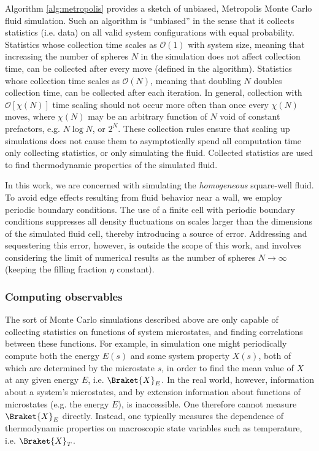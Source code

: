 \documentclass[11pt]{article}
\newcommand{\bk}{\Braket} %
\newcommand{\p}[1]{\left(#1\right)} %
\renewcommand{\sp}[1]{\left[#1\right]} %
\begin{document}
Algorithm \ref{alg:metropolis} provides a sketch of unbiased,
Metropolis Monte Carlo fluid simulation. Such an algorithm is
``unbiased'' in the sense that it collects statistics (i.e. data) on
all valid system configurations with equal probability. Statistics
whose collection time scales as $\mathcal O\p{1}$ with system size,
meaning that increasing the number of spheres $N$ in the simulation
does not affect collection time, can be collected after every move
(defined in the algorithm). Statistics whose collection time scales as
$\mathcal O\p{N}$, meaning that doubling $N$ doubles collection time,
can be collected after each iteration. In general, collection with
$\mathcal O\sp{\chi\p{N}}$ time scaling should not occur more often
than once every $\chi\p{N}$ moves, where $\chi\p{N}$ may be an
arbitrary function of $N$ void of constant prefactors, e.g. $N\log N$,
or $2^N$. These collection rules ensure that scaling up simulations
does not cause them to asymptotically spend all computation time only
collecting statistics, or only simulating the fluid. Collected
statistics are used to find thermodynamic properties of the simulated
fluid.

In this work, we are concerned with simulating the \emph{homogeneous}
square-well fluid. To avoid edge effects resulting from fluid behavior
near a wall, we employ periodic boundary conditions. The use of a
finite cell with periodic boundary conditions suppresses all density
fluctuations on scales larger than the dimensions of the simulated
fluid cell, thereby introducing a source of error. Addressing and
sequestering this error, however, is outside the scope of this work,
and involves considering the limit of numerical results as the number
of spheres $N\to\infty$ (keeping the filling fraction $\eta$
constant).

\subsubsection{Computing observables}
\label{sec:computing_observables}

The sort of Monte Carlo simulations described above are only capable
of collecting statistics on functions of system microstates, and
finding correlations between these functions. For example, in
simulation one might periodically compute both the energy $E\p{s}$ and
some system property $X\p{s}$, both of which are determined by the
microstate $s$, in order to find the mean value of $X$ at any given
energy $E$, i.e. $\bk{X}_E$. In the real world, however, information
about a system's microstates, and by extension information about
functions of microstates (e.g. the energy $E$), is inaccessible. One
therefore cannot measure $\bk{X}_E$ directly. Instead, one typically
measures the dependence of thermodynamic properties on macroscopic
state variables such as temperature, i.e. $\bk{X}_T$.
\end{document}

